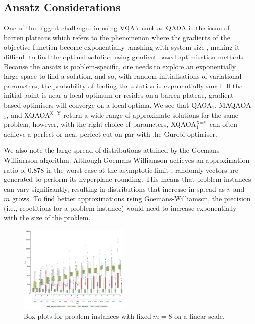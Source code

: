 \subsection{Ansatz Considerations} \label{disc:ansatz}
One of the biggest challenges in using VQA's such as QAOA is the issue of barren plateaus which refers to the phenomenon where the gradients of the objective function become exponentially vanshing with system size \cite{mcclean2018barren}, making it difficult to find the optimal solution using gradient-based optimisation methods. Because the ansatz is problem-specific, one needs to explore an exponentially large space to find a solution, and so, with random initialisations of variational parameters, the probability of finding the solution is exponentially small. If the initial point is near a local optimum or resides on a barren plateau, gradient-based optimisers will converge on a local optima. We see that QAOA$_1$, MAQAOA$_1$, and XQAOA$_1^\text{X=Y}$ return a wide range of approximate solutions for the same problem, however, with the right choice of parameters, XQAOA$_1^\text{X=Y}$ can often achieve a perfect or near-perfect cut on par with the Gurobi optimiser. 

We also note the large spread of distributions attained by the Goemans-Williamson algorithm. Although Goemans-Williamson achieves an approximation ratio of 0.878 in the worst case at the asymptotic limit \cite{goemans1994879}, randomly vectors are generated to perform its hyperplane rounding. This means that problem instances can vary significantly, resulting in distributions that increase in spread as $n$ and $m$ grows. To find better approximations using Goemans-Williamson, the precision (i.e., repetitions for a problem instance) would need to increase exponentially with the size of the problem.
\begin{figure}
    \centering
    \includegraphics[width=0.48\textwidth]{"../figures/fixed_m_normal.png"}
    \caption{Box plots for problem instances with fixed $m=8$ on a linear scale.}
    \label{fig:fixed_m_normal}
\end{figure}
